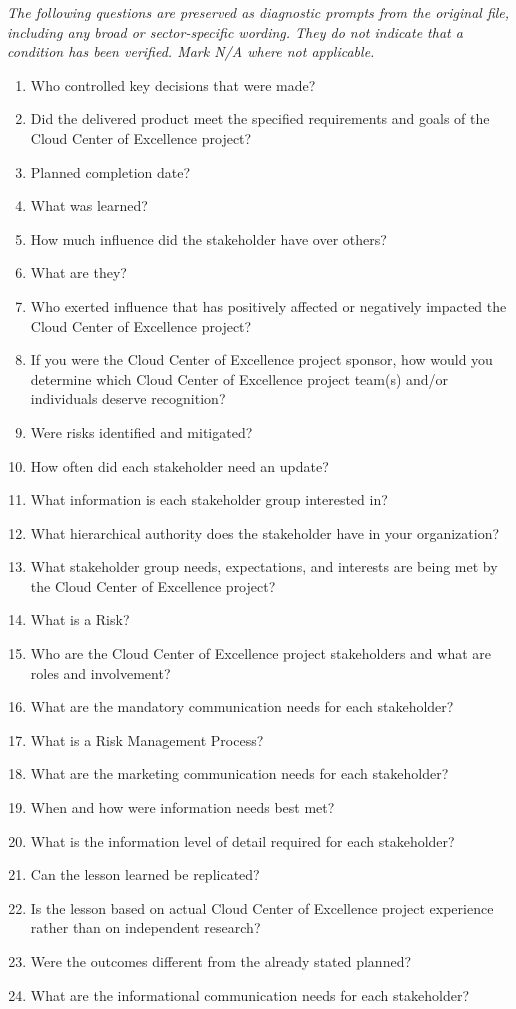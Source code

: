 \documentclass[10pt,letterpaper]{article}
\newcommand{\docsection}[1]{\par\Needspace{5\baselineskip}\vspace{8pt}{\large\sffamily\bfseries\color{navy}#1}\par\vspace{2pt}{\color{rulegrey}\rule{\linewidth}{.6pt}}\par}
\begin{document}
\docsection{03 \quad Source diagnostic checklist}
\textit{The following questions are preserved as diagnostic prompts from the original file, including any broad or sector-specific wording. They do not indicate that a condition has been verified. Mark N/A where not applicable.}
\begingroup\small\begin{enumerate}[leftmargin=2.1em, itemsep=4pt]
\item[1.] Who controlled key decisions that were made?
\item[2.] Did the delivered product meet the specified requirements and goals of the Cloud Center of Excellence project?
\item[3.] Planned completion date?
\item[4.] What was learned?
\item[5.] How much influence did the stakeholder have over others?
\item[6.] What are they?
\item[7.] Who exerted influence that has positively affected or negatively impacted the Cloud Center of Excellence project?
\item[8.] If you were the Cloud Center of Excellence project sponsor, how would you determine which Cloud Center of Excellence project team(s) and/or individuals deserve recognition?
\item[9.] Were risks identified and mitigated?
\item[10.] How often did each stakeholder need an update?
\item[11.] What information is each stakeholder group interested in?
\item[12.] What hierarchical authority does the stakeholder have in your organization?
\item[13.] What stakeholder group needs, expectations, and interests are being met by the Cloud Center of Excellence project?
\item[14.] What is a Risk?
\item[15.] Who are the Cloud Center of Excellence project stakeholders and what are roles and involvement?
\item[16.] What are the mandatory communication needs for each stakeholder?
\item[17.] What is a Risk Management Process?
\item[18.] What are the marketing communication needs for each stakeholder?
\item[19.] When and how were information needs best met?
\item[20.] What is the information level of detail required for each stakeholder?
\item[21.] Can the lesson learned be replicated?
\item[22.] Is the lesson based on actual Cloud Center of Excellence project experience rather than on independent research?
\item[23.] Were the outcomes different from the already stated planned?
\item[24.] What are the informational communication needs for each stakeholder?
\end{enumerate}\endgroup
\end{document}
